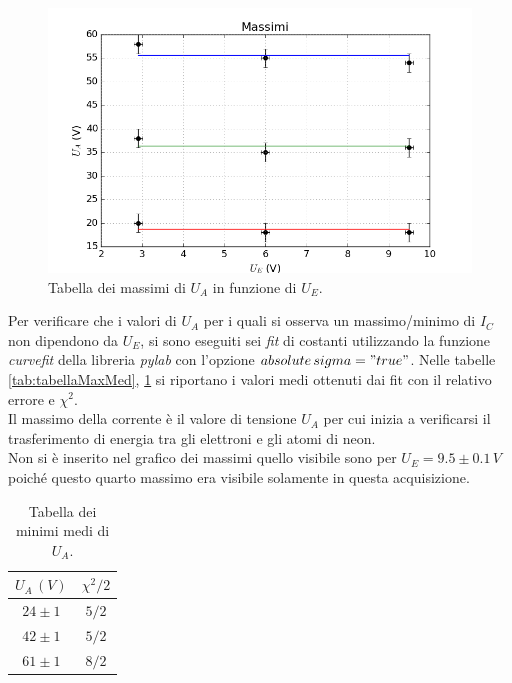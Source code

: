 \documentclass[10pt,a4paper]{article}
\begin{document}
\begin{figure}[!htb]
  \centering
  \includegraphics[scale=.7]{max.png}
\caption{Tabella dei massimi di $U_A$ in funzione di $U_E$.\label{graficoMax}}

\end{figure}

Per verificare che i valori di $U_A$ per i quali si osserva un massimo/minimo di $I_C$ non dipendono da $U_E$, si sono eseguiti sei \emph{fit} di costanti utilizzando la funzione \emph{curvefit} della libreria \emph{pylab} con l'opzione \emph{$absolute\,sigma = "true"$}. Nelle tabelle \ref{tab:tabellaMaxMed}, \ref{tab:tabellaMinMed} si riportano i valori medi ottenuti dai fit con il relativo errore e $\chi^2$.\\
Il massimo della corrente è il valore di tensione $U_A$ per cui inizia a verificarsi il trasferimento di energia tra gli elettroni e gli atomi di neon.\\
Non si è inserito nel grafico dei massimi quello visibile sono per $U_E=9.5\pm0.1\,V$ poiché questo quarto massimo era visibile solamente in questa acquisizione.\\


\begin{table}[!htb]
\centering
\begin{tabular}{|c|c|}
\hline 
$U_A\,(V)$ & $\chi^2 /2$ \\ 
\hline 
$24\pm1$ & $5/2$ \\ 
\hline 
$42\pm1$ & $5/2$ \\ 
\hline 
$61\pm1$ & $8/2$ \\ 
\hline 
\end{tabular}
\caption{Tabella dei minimi medi di $U_A$.\label{tab:tabellaMinMed}}

\end{table}
\end{document}
